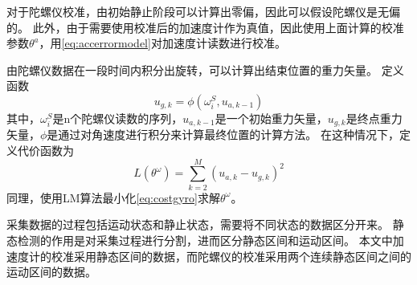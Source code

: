\documentclass[
  type=master
]{gdutthesis}
\begin{document}
对于陀螺仪校准，由初始静止阶段可以计算出零偏，因此可以假设陀螺仪是无偏的。
此外，由于需要使用校准后的加速度计作为真值，因此使用上面计算的校准参数$\theta^a$，用\autoref{eq:accerrormodel}对加速度计读数进行校准。

由陀螺仪数据在一段时间内积分出旋转，可以计算出结束位置的重力矢量。
定义函数
\begin{equation}\label{eq:integration}
	u_{g,k}=\phi(\omega^S_i , u_{a,k-1})
\end{equation}
其中，$\omega^S_i$是n个陀螺仪读数的序列，$u_{a,k-1}$是一个初始重力矢量，$u_{g,k}$是终点重力矢量，$\phi$是通过对角速度进行积分来计算最终位置的计算方法。
在这种情况下，定义代价函数为
\begin{equation}\label{eq:costgyro}
	L(\theta^\omega)=\sum_{k=2}^{M}(u_{a,k}-u_{g,k})^2
\end{equation}
同理，使用LM算法最小化\autoref{eq:costgyro}求解$\theta^\omega$。

采集数据的过程包括运动状态和静止状态，需要将不同状态的数据区分开来。
静态检测的作用是对采集过程进行分割，进而区分静态区间和运动区间。
本文中加速度计的校准采用静态区间的数据，而陀螺仪的校准采用两个连续静态区间之间的运动区间的数据。
\end{document}
